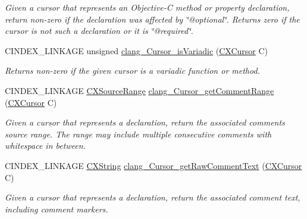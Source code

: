 \begin{DoxyCompactItemize}
\begin{DoxyCompactList}\small\item\em Given a cursor that represents an Objective-\/C method or property declaration, return non-\/zero if the declaration was affected by \char`\"{}@optional\char`\"{}. Returns zero if the cursor is not such a declaration or it is \char`\"{}@required\char`\"{}. \end{DoxyCompactList}\item 
\mbox{\label{group__CINDEX__CURSOR__XREF_ga3a9a5766db391fa5ca88b347651e5b8e}} 
C\+I\+N\+D\+E\+X\+\_\+\+L\+I\+N\+K\+A\+GE unsigned \hyperlink{group__CINDEX__CURSOR__XREF_ga3a9a5766db391fa5ca88b347651e5b8e}{clang\+\_\+\+Cursor\+\_\+is\+Variadic} (\hyperlink{structCXCursor}{C\+X\+Cursor} C)
\begin{DoxyCompactList}\small\item\em Returns non-\/zero if the given cursor is a variadic function or method. \end{DoxyCompactList}\item 
\mbox{\label{group__CINDEX__CURSOR__XREF_gab5e05b0cc042fbd91ecaf1790ece0ecc}} 
C\+I\+N\+D\+E\+X\+\_\+\+L\+I\+N\+K\+A\+GE \hyperlink{structCXSourceRange}{C\+X\+Source\+Range} \hyperlink{group__CINDEX__CURSOR__XREF_gab5e05b0cc042fbd91ecaf1790ece0ecc}{clang\+\_\+\+Cursor\+\_\+get\+Comment\+Range} (\hyperlink{structCXCursor}{C\+X\+Cursor} C)
\begin{DoxyCompactList}\small\item\em Given a cursor that represents a declaration, return the associated comment\textquotesingle{}s source range. The range may include multiple consecutive comments with whitespace in between. \end{DoxyCompactList}\item 
\mbox{\label{group__CINDEX__CURSOR__XREF_ga32905a8b1858e67cf5d28b7ad7150779}} 
C\+I\+N\+D\+E\+X\+\_\+\+L\+I\+N\+K\+A\+GE \hyperlink{structCXString}{C\+X\+String} \hyperlink{group__CINDEX__CURSOR__XREF_ga32905a8b1858e67cf5d28b7ad7150779}{clang\+\_\+\+Cursor\+\_\+get\+Raw\+Comment\+Text} (\hyperlink{structCXCursor}{C\+X\+Cursor} C)
\begin{DoxyCompactList}\small\item\em Given a cursor that represents a declaration, return the associated comment text, including comment markers. \end{DoxyCompactList}\item 

\end{DoxyCompactItemize}
